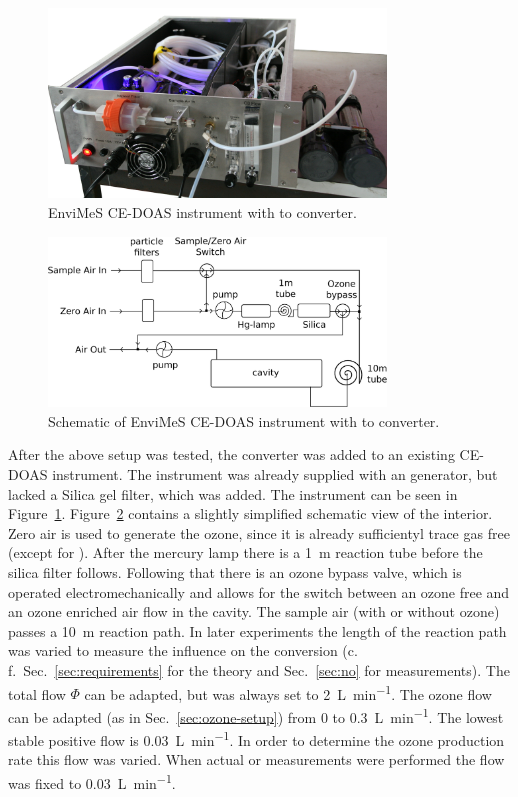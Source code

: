 \begin{figure}[htbp]
  \centering
  \includegraphics[width=0.8\textwidth]{images/InstrumentEdited_small.jpg}
  \caption{EnviMeS CE-DOAS instrument with  to 
    converter.}
  \label{fig:envimes}
\end{figure}

\begin{figure}[htbp]
  \centering
  \includegraphics[width=0.8\textwidth]{images/envimes_setup.eps}
  \caption{Schematic of EnviMeS CE-DOAS instrument with  to
     converter.}
  \label{fig:envimes-schematic}
\end{figure}

After the above setup was tested, the converter was added to an
existing CE-DOAS instrument. The instrument was already supplied with
an  generator, but lacked a Silica gel filter, which was
added. The instrument can be seen in
Figure~\ref{fig:envimes}. Figure~\ref{fig:envimes-schematic} contains
a slightly simplified schematic view of the interior. Zero air is used
to generate the ozone, since it is already sufficientyl trace gas free
(except for ). After the mercury lamp there is a
\SI{1}{\meter} reaction tube before the silica filter
follows. Following that there is an ozone bypass valve, which is
operated electromechanically and allows for the switch between an
ozone free and an ozone enriched air flow in the cavity. The sample
air (with or without ozone) passes a \SI{10}{\meter} reaction path. In
later experiments the length of the reaction path was varied to
measure the influence on the  conversion (c.\,f.\
Sec.~\ref{sec:requirements} for the theory and Sec.~\ref{sec:no} for
measurements). The total flow $\Phi$ can be adapted, but was always
set to \SI{2}{\liter\per\minute}. The ozone flow can be adapted (as in
Sec.~\ref{sec:ozone-setup}) from 0 to \SI{0.3}{\liter\per\minute}. The
lowest stable positive flow is \SI{0.03}{\liter\per\minute}. In order
to determine the ozone production rate this flow was varied. When
actual \ch{NO} or \ch{NO_x} measurements were performed the flow was
fixed to \SI{0.03}{\liter\per\minute}.

